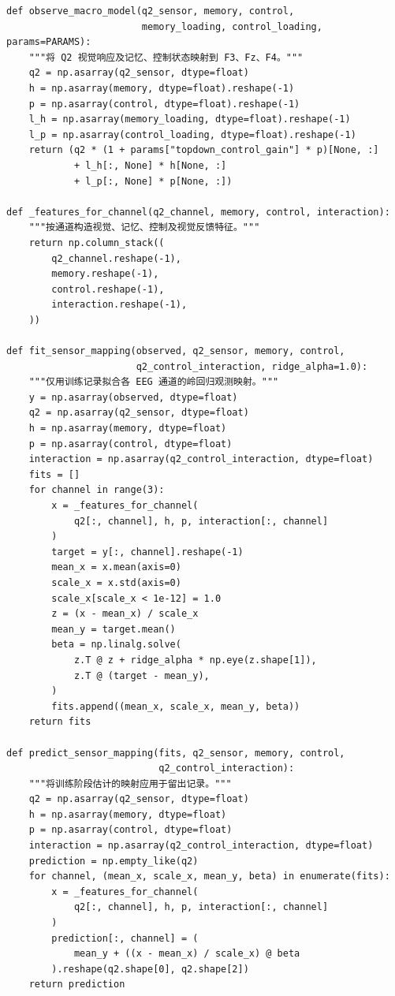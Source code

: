 \begin{lstlisting}[style=appendixPython]
def observe_macro_model(q2_sensor, memory, control,
                        memory_loading, control_loading, params=PARAMS):
    """将 Q2 视觉响应及记忆、控制状态映射到 F3、Fz、F4。"""
    q2 = np.asarray(q2_sensor, dtype=float)
    h = np.asarray(memory, dtype=float).reshape(-1)
    p = np.asarray(control, dtype=float).reshape(-1)
    l_h = np.asarray(memory_loading, dtype=float).reshape(-1)
    l_p = np.asarray(control_loading, dtype=float).reshape(-1)
    return (q2 * (1 + params["topdown_control_gain"] * p)[None, :]
            + l_h[:, None] * h[None, :]
            + l_p[:, None] * p[None, :])

def _features_for_channel(q2_channel, memory, control, interaction):
    """按通道构造视觉、记忆、控制及视觉反馈特征。"""
    return np.column_stack((
        q2_channel.reshape(-1),
        memory.reshape(-1),
        control.reshape(-1),
        interaction.reshape(-1),
    ))

def fit_sensor_mapping(observed, q2_sensor, memory, control,
                       q2_control_interaction, ridge_alpha=1.0):
    """仅用训练记录拟合各 EEG 通道的岭回归观测映射。"""
    y = np.asarray(observed, dtype=float)
    q2 = np.asarray(q2_sensor, dtype=float)
    h = np.asarray(memory, dtype=float)
    p = np.asarray(control, dtype=float)
    interaction = np.asarray(q2_control_interaction, dtype=float)
    fits = []
    for channel in range(3):
        x = _features_for_channel(
            q2[:, channel], h, p, interaction[:, channel]
        )
        target = y[:, channel].reshape(-1)
        mean_x = x.mean(axis=0)
        scale_x = x.std(axis=0)
        scale_x[scale_x < 1e-12] = 1.0
        z = (x - mean_x) / scale_x
        mean_y = target.mean()
        beta = np.linalg.solve(
            z.T @ z + ridge_alpha * np.eye(z.shape[1]),
            z.T @ (target - mean_y),
        )
        fits.append((mean_x, scale_x, mean_y, beta))
    return fits

def predict_sensor_mapping(fits, q2_sensor, memory, control,
                           q2_control_interaction):
    """将训练阶段估计的映射应用于留出记录。"""
    q2 = np.asarray(q2_sensor, dtype=float)
    h = np.asarray(memory, dtype=float)
    p = np.asarray(control, dtype=float)
    interaction = np.asarray(q2_control_interaction, dtype=float)
    prediction = np.empty_like(q2)
    for channel, (mean_x, scale_x, mean_y, beta) in enumerate(fits):
        x = _features_for_channel(
            q2[:, channel], h, p, interaction[:, channel]
        )
        prediction[:, channel] = (
            mean_y + ((x - mean_x) / scale_x) @ beta
        ).reshape(q2.shape[0], q2.shape[2])
    return prediction


\end{lstlisting}

